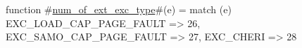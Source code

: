 function #\hyperref[sailRISCVznumzyofzyextzyexczytype]{num\_of\_ext\_exc\_type}#(e) =
  match (e) {
    EXC_LOAD_CAP_PAGE_FAULT => 26,
    EXC_SAMO_CAP_PAGE_FAULT => 27,
    EXC_CHERI               => 28
  }
